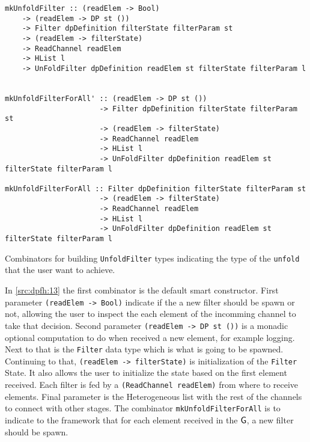 \begin{listing}[htp!]
  \begin{verbatim}
mkUnfoldFilter :: (readElem -> Bool) 
    -> (readElem -> DP st ()) 
    -> Filter dpDefinition filterState filterParam st 
    -> (readElem -> filterState)
    -> ReadChannel readElem
    -> HList l 
    -> UnFoldFilter dpDefinition readElem st filterState filterParam l


mkUnfoldFilterForAll' :: (readElem -> DP st ())
                      -> Filter dpDefinition filterState filterParam st
                      -> (readElem -> filterState)
                      -> ReadChannel readElem
                      -> HList l
                      -> UnFoldFilter dpDefinition readElem st filterState filterParam l

mkUnfoldFilterForAll :: Filter dpDefinition filterState filterParam st
                      -> (readElem -> filterState)
                      -> ReadChannel readElem
                      -> HList l
                      -> UnFoldFilter dpDefinition readElem st filterState filterParam l
   \end{verbatim}
  \caption[{[\texttt{Stage.hs}] UnfoldFilter combinators}]{Combinators for building \texttt{UnfoldFilter} types indicating the type of the \texttt{unfold} that the user want to achieve.}
  \label{src:dpfh:13}
\end{listing}

In \autoref{src:dpfh:13} the first combinator is the default smart constructor. First parameter \texttt{(readElem -> Bool)} indicate if the a new filter should 
be spawn or not, allowing the user to inspect the each element of the incomming channel to take that decision. Second parameter \texttt{(readElem -> DP st ())} is a monadic optional computation to do when received a new element, for example logging.
Next to that is the \texttt{Filter} data type which is what is going to be spawned. Continuing to that, \texttt{(readElem -> filterState)} is initialization of the \texttt{Filter} State. It also allows the user to initialize the state based on the first element received. 
Each filter is fed by a \texttt{(ReadChannel readElem)} from where to receive elements. Final parameter is the Heterogeneous list with the rest of the channels to connect with other stages.
The combinator \texttt{mkUnfoldFilterForAll} is to indicate to the framework that for each element received in the $\mathsf{G}$, a new filter should be spawn.

